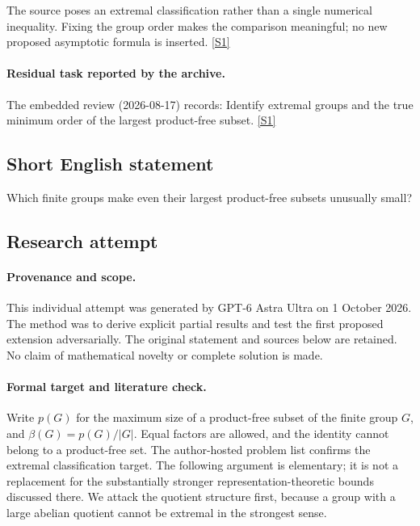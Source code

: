 \documentclass[11pt,a4paper]{article}
\newcommand{\sref}[2]{\hyperlink{source:#1:#2}{[S#2]}}
\begin{document}
The source poses an extremal classification rather than a single numerical inequality. Fixing the group order makes the comparison meaningful; no new proposed asymptotic formula is inserted. \sref{statement}{1}

\paragraph{Residual task reported by the archive.}

The embedded review (2026-08-17) records: Identify extremal groups and the true minimum order of the largest product-free subset. \sref{statement}{1}

\subsection{Short English statement}

Which finite groups make even their largest product-free subsets unusually small?

\subsection{Research attempt}

\paragraph{Provenance and scope.}
This individual attempt was generated by GPT-6 Astra Ultra on 1 October 2026. The method was to derive explicit partial results and test the first proposed extension adversarially. The original statement and sources below are retained. No claim of mathematical novelty or complete solution is made.

\paragraph{Formal target and literature check.}
Write $p(G)$ for the maximum size of a product-free subset of the finite group $G$, and $\beta(G)=p(G)/|G|$. Equal factors are allowed, and the identity cannot belong to a product-free set. The author-hosted problem list confirms the extremal classification target. The following argument is elementary; it is not a replacement for the substantially stronger representation-theoretic bounds discussed there. We attack the quotient structure first, because a group with a large abelian quotient cannot be extremal in the strongest sense.
\end{document}
